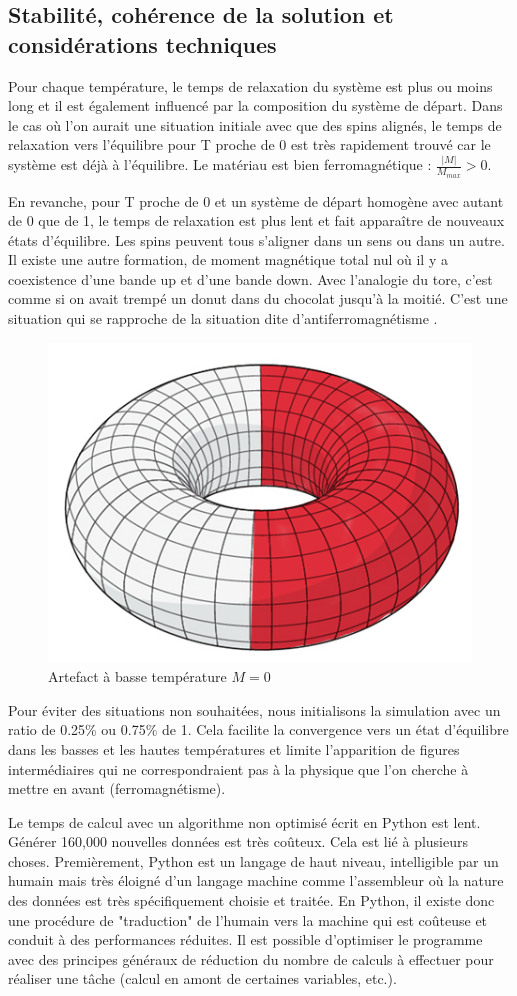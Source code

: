 \documentclass[11pt, parskip=half]{scrartcl} %
\begin{document}
\subsection{Stabilité, cohérence de la solution et considérations techniques}

Pour chaque température, le temps de relaxation du système est plus ou moins long et il est également influencé par la composition du système de départ. Dans le cas où l'on aurait une situation initiale avec que des spins alignés, le temps de relaxation vers l'équilibre pour T proche de 0 est très rapidement trouvé car le système est déjà à l'équilibre. Le matériau est bien ferromagnétique : $\frac{|M|}{M_{max}} > 0$.

En revanche, pour T proche de 0 et un système de départ homogène avec autant de 0 que de 1, le temps de relaxation est plus lent et fait apparaître de nouveaux états d'équilibre. Les spins peuvent tous s'aligner dans un sens ou dans un autre. Il existe une autre formation, de moment magnétique total nul où il y a coexistence d'une bande up et d'une bande down. Avec l'analogie du tore, c'est comme si on avait trempé un donut dans du chocolat jusqu'à la moitié. C'est une situation qui se rapproche de la situation dite d'antiferromagnétisme \cite{ferromag}.

\begin{figure}[h]
	\centering
	\includegraphics[width=0.3\linewidth]{./figures/donut.jpg}
	\caption{Artefact à basse température $M=0$}
	\label{fig:H}
\end{figure}

Pour éviter des situations non souhaitées, nous initialisons la simulation avec un ratio de 0.25\% ou 0.75\% de 1. Cela facilite la convergence vers un état d'équilibre dans les basses et les hautes températures et limite l'apparition de figures intermédiaires qui ne correspondraient pas à la physique que l'on cherche à mettre en avant (ferromagnétisme).

Le temps de calcul avec un algorithme non optimisé écrit en Python est lent. Générer 160,000 nouvelles données est très coûteux. Cela est lié à plusieurs choses. Premièrement, Python est un langage de haut niveau, intelligible par un humain mais très éloigné d'un langage machine comme l'assembleur où la nature des données est très spécifiquement choisie et traitée. En Python, il existe donc une procédure de "traduction" de l'humain vers la machine qui est coûteuse et conduit à des performances réduites. Il est possible d'optimiser le programme avec des principes généraux de réduction du nombre de calculs à effectuer pour réaliser une tâche (calcul en amont de certaines variables, etc.).
\end{document}
